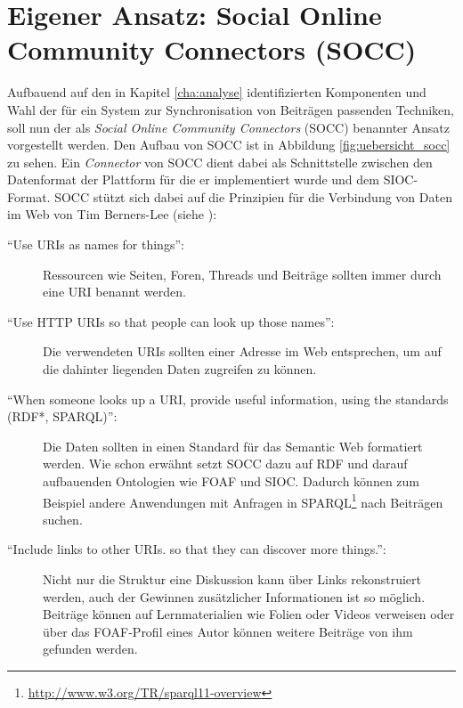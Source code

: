 
\chapter{Eigener Ansatz: Social Online Community Connectors (SOCC)} %
\label{cha:eigener_ansatz_social_online_community_connectors_socc_}

Aufbauend auf den in Kapitel \ref{cha:analyse} identifizierten Komponenten und Wahl der für ein System zur Synchronisation von Beiträgen passenden Techniken, soll nun der als \emph{Social Online Community Connectors} (SOCC) benannter Ansatz vorgestellt werden. Den Aufbau von SOCC ist in Abbildung \ref{fig:uebersicht_socc} zu sehen. Ein \emph{Connector} von SOCC dient dabei als Schnittstelle zwischen den Datenformat der Plattform für die er implementiert wurde und dem SIOC-Format. SOCC stützt sich dabei auf die Prinzipien für die Verbindung von Daten im Web von Tim Berners-Lee (siehe \cite{Berners-Lee2009}):

\begin{description}
    \item[\enquote{Use URIs as names for things}:] Ressourcen wie Seiten, Foren, Threads und Beiträge sollten immer durch eine URI benannt werden.

    \item[\enquote{Use HTTP URIs so that people can look up those names}:] Die verwendeten URIs sollten einer Adresse im Web entsprechen, um auf die dahinter liegenden Daten zugreifen zu können.

    \item[\enquote{When someone looks up a URI, provide useful information, using the standards (RDF*, SPARQL)}:] Die Daten sollten in einen Standard für das Semantic Web formatiert werden. Wie schon erwähnt setzt SOCC dazu auf RDF und darauf aufbauenden Ontologien wie FOAF und SIOC. Dadurch können zum Beispiel andere Anwendungen mit Anfragen in SPARQL\footnote{\url{http://www.w3.org/TR/sparql11-overview}} nach Beiträgen suchen.

    \item[\enquote{Include links to other URIs. so that they can discover more things.}:] Nicht nur die Struktur eine Diskussion kann über Links rekonstruiert werden, auch der Gewinnen zusätzlicher Informationen ist so möglich. Beiträge können auf Lernmaterialien wie Folien oder Videos verweisen oder über das FOAF-Profil eines Autor können weitere Beiträge von ihm gefunden werden. 
\end{description}

